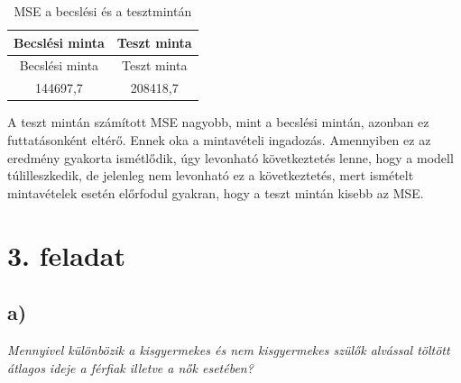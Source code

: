 \documentclass[
]{article}
\newenvironment{Shaded}{\begin{snugshade}}{\end{snugshade}}
\newcommand{\DataTypeTok}[1]{\textcolor[rgb]{0.13,0.29,0.53}{#1}}
\newcommand{\DecValTok}[1]{\textcolor[rgb]{0.00,0.00,0.81}{#1}}
\newcommand{\KeywordTok}[1]{\textcolor[rgb]{0.13,0.29,0.53}{\textbf{#1}}}
\newcommand{\NormalTok}[1]{#1}
\newcommand{\OperatorTok}[1]{\textcolor[rgb]{0.81,0.36,0.00}{\textbf{#1}}}
\newcommand{\StringTok}[1]{\textcolor[rgb]{0.31,0.60,0.02}{#1}}
\begin{document}
\begin{longtable}[]{@{}cc@{}}
\caption{MSE a becslési és a tesztmintán}\tabularnewline
\toprule
Becslési minta & Teszt minta\tabularnewline
\midrule
\endfirsthead
\toprule
Becslési minta & Teszt minta\tabularnewline
\midrule
\endhead
144697,7 & 208418,7\tabularnewline
\bottomrule
\end{longtable}

A teszt mintán számított MSE nagyobb, mint a becslési mintán, azonban ez
futtatásonként eltérő. Ennek oka a mintavételi ingadozás. Amennyiben ez
az eredmény gyakorta ismétlődik, úgy levonható következtetés lenne, hogy
a modell túlilleszkedik, de jelenleg nem levonható ez a következtetés,
mert ismételt mintavételek esetén előrfodul gyakran, hogy a teszt mintán
kisebb az MSE.

\hypertarget{feladat-2}{%
\section{3. feladat}\label{feladat-2}}

\hypertarget{a-2}{%
\subsection{a)}\label{a-2}}

\emph{Mennyivel különbözik a kisgyermekes és nem kisgyermekes szülők
alvással töltött átlagos ideje a férfiak illetve a nők esetében?}

\begin{Shaded}
\end{Shaded}
\end{document}
